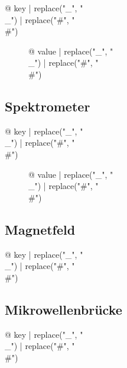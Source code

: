 \begin{multicols}{2}
\begin{description}
\item[{@ key | replace("_", "\\_") | replace("#", "\\#") }] {@ value | replace("_", "\\_") | replace("#", "\\#") }
\end{description}

\subsection{Spektrometer}

\begin{description}
\item[{@ key | replace("_", "\\_") | replace("#", "\\#") }] {@ value | replace("_", "\\_") | replace("#", "\\#") }
\end{description}

\subsection{Magnetfeld}

\begin{description}
\item[{@ key | replace("_", "\\_") | replace("#", "\\#") }] %
\end{description}

\subsection{Mikrowellenbrücke}

\begin{description}
\item[{@ key | replace("_", "\\_") | replace("#", "\\#") }] %
\end{description}


\end{multicols}
